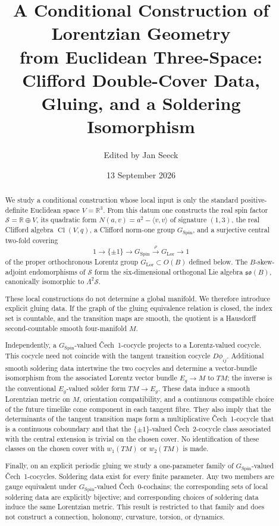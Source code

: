 \documentclass[11pt,a4paper]{article}
\title{\textbf{A Conditional Construction of Lorentzian Geometry}\\[0.35em]
\large from Euclidean Three-Space: Clifford Double-Cover Data, Gluing, and a Soldering Isomorphism}
\author{Edited by Jan Seeck}
\date{13 September 2026}
\theoremstyle{definition}
\theoremstyle{remark}
\newcommand{\R}{\mathbb{R}}
\newcommand{\Smodel}{\mathcal{S}}
\newcommand{\Cl}{\operatorname{Cl}}
\newcommand{\SpinG}{G_{\mathrm{Spin}}}
\newcommand{\LorG}{G_{\mathrm{Lor}}}
\newcommand{\Cech}{\ifmmode\text{\v{C}ech}\else\v{C}ech\fi}
\begin{document}
\maketitle

\begin{abstract}
We study a conditional construction whose local input is only the standard
positive-definite Euclidean space \(V=\R^{3}\).  From this datum one constructs
the real spin factor \(\Smodel=\R\oplus V\), its quadratic form
\(N(a,v)=a^{2}-\langle v,v\rangle\) of signature \((1,3)\), the real
Clifford algebra \(\Cl(V,q)\), a Clifford norm-one group \(\SpinG\), and a
surjective central two-fold covering
\[
   1\longrightarrow\{\pm1\}
   \longrightarrow \SpinG
   \overset{\rho}{\longrightarrow}\LorG
   \longrightarrow 1
\]
of the proper orthochronous Lorentz group \(\LorG\subset O(B)\) defined
below.  The \(B\)-skew-adjoint endomorphisms of \(\Smodel\) form the
six-dimensional orthogonal Lie algebra \(\mathfrak{so}(B)\), canonically
isomorphic to \(\Lambda^{2}\Smodel\).

These local constructions do not determine a global manifold.  We therefore
introduce explicit gluing data.  If the graph of the gluing equivalence
relation is closed, the index set is countable, and the transition maps are
smooth, the quotient is a Hausdorff second-countable smooth four-manifold
\(M\).

Independently, a \(\SpinG\)-valued \Cech\ 1-cocycle projects to a
Lorentz-valued cocycle.  This cocycle need not coincide with the tangent
transition cocycle \(D\phi_{ij}\).  Additional smooth soldering data
intertwine the two cocycles and determine a vector-bundle isomorphism from
the associated Lorentz vector bundle \(E_g\to M\) to \(TM\); the inverse is the
conventional \(E_g\)-valued solder form \(TM\to E_g\).  These data induce a smooth Lorentzian
metric on \(M\), orientation compatibility, and a continuous compatible
choice of the future timelike cone component in each tangent fibre.  They also imply that the
determinants of the tangent transition maps form a multiplicative \Cech\ 1-cocycle that is a continuous coboundary
and that the \(\{\pm1\}\)-valued \Cech\ 2-cocycle class associated with the
central extension is trivial on the chosen cover.  No identification of
these classes on the chosen cover with \(w_{1}(TM)\) or \(w_{2}(TM)\) is made.

Finally, on an explicit periodic gluing we study a one-parameter family of
\(\SpinG\)-valued \Cech\ 1-cocycles.  Soldering data exist for every finite
parameter.  Any two members are gauge equivalent under
\(\SpinG\)-valued \Cech\ 0-cochains; the corresponding sets of local soldering data
are explicitly bijective; and corresponding choices of soldering data induce the same
Lorentzian metric.  This result is restricted to that family and does not
construct a connection, holonomy, curvature, torsion, or dynamics.
\end{abstract}
\clearpage
\end{document}

